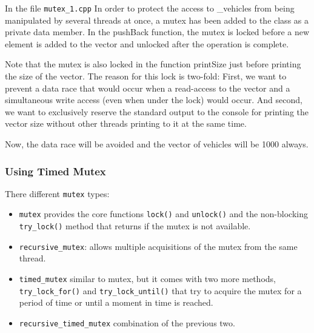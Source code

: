 \documentclass[11pt, a4paper]{article}
\begin{document}
In the file \texttt{mutex\_1.cpp} In order to protect the access to \_vehicles from being manipulated by several threads at once, a mutex has been added to the class as a private data member. In the pushBack function, the mutex is locked before a new element is added to the vector and unlocked after the operation is complete.

Note that the mutex is also locked in the function printSize just before printing the size of the vector. The reason for this lock is two-fold: First, we want to prevent a data race that would occur when a read-access to the vector and a simultaneous write access (even when under the lock) would occur. And second, we want to exclusively reserve the standard output to the console for printing the vector size without other threads printing to it at the same time.


Now, the data race will be avoided and the vector of vehicles will be 1000 always.


\subsubsection{Using Timed Mutex}%
\label{ssub:using_timed_mutex}

There different \texttt{mutex} types:

\begin{itemize}
	\item \texttt{mutex} provides the core functions \texttt{lock()} and \texttt{unlock()} and the non-blocking \texttt{try\_lock()} method that returns if the mutex is not available.
	\item \texttt{recursive\_mutex}: allows multiple acquisitions of the mutex from the same thread.
	\item \texttt{timed\_mutex} similar to mutex, but it comes with two more methods, \texttt{try\_lock\_for()} and \texttt{try\_lock\_until()} that try to acquire the mutex for a period of time or until a moment in time is reached. 
	\item \texttt{recursive\_timed\_mutex} combination of the previous two.
\end{itemize}
\end{document}
